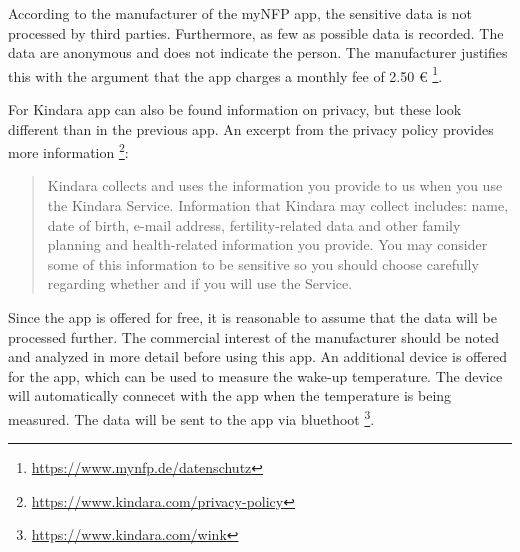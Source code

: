 According to the manufacturer of the myNFP app, the sensitive data is not processed by third parties. Furthermore, as few as possible data is recorded. The data are anonymous and does not indicate the person. The manufacturer justifies this with the argument that the app charges a monthly fee of 2.50 \euro{} \footnote{\url{https://www.mynfp.de/datenschutz}}.

For Kindara app can also be found information on privacy, but these look different than in the previous app. An excerpt from the privacy policy provides more information \footnote{\url{https://www.kindara.com/privacy-policy}}:
\begin{quote}
	Kindara collects and uses the information you provide to us when you use the Kindara Service. Information that Kindara may collect includes: name, date of birth, e-mail address, fertility-related data and other family planning and health-related information you provide. You may consider some of this information to be sensitive so you should choose carefully regarding whether and if you will use the Service.
\end{quote}
Since the app is offered for free, it is reasonable to assume that the data will be processed further. The commercial interest of the manufacturer should be noted and analyzed in more detail before using this app.
An additional device is offered for the app, which can be used to measure the wake-up temperature. The device will automatically connecet with the app when the temperature is being measured. The data will be sent to the app via bluethoot \footnote{\url{https://www.kindara.com/wink}}.

